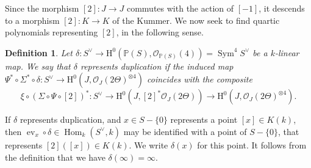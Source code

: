 \documentclass{article} %
\newtheorem{definition}[proposition]{Definition}
\numberwithin{equation}{section}
\DeclareMathOperator{\Hom}{Hom}
\DeclareMathOperator{\Sym}{Sym}
\renewcommand{\P}{\mathbb{P}}
\renewcommand{\O}{\mathcal{O}}
\newcommand{\HH}{\mathrm{H}}
\newcommand{\cO}{\mathcal{O}}
\begin{document}
Since the morphism $[2] : J \to J$ commutes with the action of $[-1]$, it descends to a morphism $[2] : K \to K$ of the Kummer. We now seek to find quartic polynomials representing $[2]$, in the following sense.
\begin{definition}\label{def_represents_duplication}
    Let $\delta : S^\vee \to\HH^0(\P(S), \cO_{\P(S)}(4)) = \Sym^4 S^\vee$ be a $k$-linear map. We say that $\delta$ represents duplication if the induced map $\Psi^\ast \circ \Sigma^\ast \circ \delta : S^\vee \to\HH^0(J, \O_J(2 \Theta)^{ \otimes 4})$ coincides with the composite
\begin{equation}\label{eqn_duplication_on_kummer} \xi \circ (\Sigma \circ \Psi \circ [2])^\ast : S^\vee \to\HH^0(J, [2]^\ast \O_J(2 \Theta)) \to\HH^0(J,\O_J(2 \Theta)^{\otimes 4}). 
\end{equation}
\end{definition}
If $\delta$ represents duplication, and $x \in S - \{ 0 \}$ represents a point $[x] \in K(k)$, then $\operatorname{ev}_x \circ \delta \in \Hom_k(S^\vee, k)$ may be identified with a point of $S - \{ 0 \}$, that represents $[2]([x]) \in K(k)$. We write $\delta(x)$ for this point. It follows from the definition that we have $\delta(\infty) = \infty$.
\end{document}

